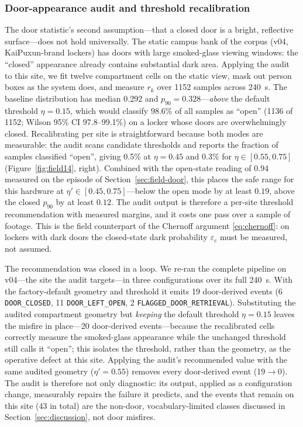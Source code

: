 \documentclass[journal,article,submit,oneauthor]{Definitions/mdpi}
\begin{document}
\subsubsection{Door-appearance audit and threshold recalibration}
The door statistic's second assumption---that a closed door is a bright, reflective
surface---does not hold universally. The static campus bank of the corpus (v04,
KaiPuxun-brand lockers) has doors with large smoked-glass viewing windows: the ``closed''
appearance already contains substantial dark area. Applying the audit to this site, we fit
twelve compartment cells on the static view, mask out person boxes as the system does, and
measure $r_k$ over 1152 samples across 240~s. The baseline distribution has median 0.292
and $p_{90}=0.328$---\emph{above} the default threshold $\eta=0.15$, which would classify
98.6\% of all samples as ``open'' (1136 of 1152; Wilson 95\% CI 97.8--99.1\%) on a locker
whose doors are overwhelmingly closed.
Recalibrating per site is straightforward because both modes are measurable: the audit
scans candidate thresholds and reports the fraction of samples classified ``open'', giving
0.5\% at $\eta=0.45$ and 0.3\% for $\eta\in[0.55,0.75]$ (Figure~\ref{fig:field14}, right).
Combined with the open-state reading of 0.94 measured on the episode of
Section~\ref{sec:field-door}, this places the safe range for this hardware at
$\eta'\in[0.45,0.75]$---below the open mode by at least $0.19$, above the closed $p_{90}$
by at least $0.12$. The audit output is therefore a per-site threshold recommendation with
measured margins, and it costs one pass over a sample of footage. This is the field
counterpart of the Chernoff argument \eqref{eq:chernoff}: on lockers with dark doors the
closed-state dark probability $\varepsilon_c$ must be measured, not assumed.

The recommendation was closed in a loop. We re-ran the
complete pipeline on v04---the site the audit targets---in three configurations over its
full 240~s. With the factory-default geometry and threshold it emits 19 door-derived
events (6 \texttt{DOOR\_CLOSED}, 11 \texttt{DOOR\_LEFT\_OPEN}, 2
\texttt{FLAGGED\_DOOR\_RETRIEVAL}). Substituting the audited compartment geometry but
\emph{keeping} the default threshold $\eta=0.15$ leaves the misfire in place---20
door-derived events---because the recalibrated cells correctly measure the smoked-glass
appearance while the unchanged threshold still calls it ``open''; this isolates
the threshold, rather than the geometry, as the operative defect at this site. Applying
the audit's recommended value with the same audited geometry ($\eta'=0.55$) removes
every door-derived event (19$\to$0). The audit is therefore not only diagnostic: its
output, applied as a configuration change, measurably repairs the failure it predicts,
and the events that remain on this site (43 in total) are the non-door, vocabulary-limited
classes discussed in Section~\ref{sec:discussion}, not door misfires.
\end{document}
